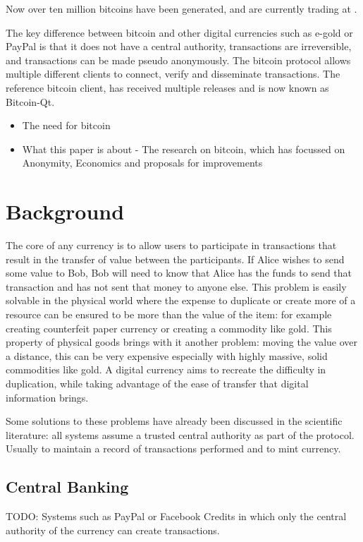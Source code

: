 Now over ten million bitcoins have been generated, and are currently trading at
.

The key difference between bitcoin and other digital currencies such as e-gold
or PayPal is that it does not have a central authority, transactions are
irreversible, and transactions can be made pseudo anonymously.  The bitcoin
protocol allows multiple different clients to connect, verify and disseminate
transactions.  The reference bitcoin client, has received multiple releases and
is now known as Bitcoin-Qt.

\begin{itemize} \item The need for bitcoin \item What this paper is about - The
research on bitcoin, which has focussed on Anonymity, Economics and proposals
for improvements \end{itemize}

\section{Background} The core of any currency is to allow users to participate
in transactions that result in the transfer of value between the participants.
If Alice wishes to send some value to Bob, Bob will need to know that Alice has
the funds to send that transaction and has not sent that money to anyone else.
This problem is easily solvable in the physical world where the expense to
duplicate or create more of a resource can be ensured to be more than the value
of the item: for example creating counterfeit paper currency or creating a
commodity like gold.  This property of physical goods brings with it another
problem: moving the value over a distance, this can be very expensive
especially with highly massive, solid commodities like gold.  A digital
currency aims to recreate the difficulty in duplication, while taking advantage
of the ease of transfer that digital information brings.

Some solutions to these problems have already been discussed in the scientific
literature: all systems assume a trusted central authority as part of the
protocol. Usually to maintain a record of transactions performed and to mint
currency.

\subsection{Central Banking} TODO: Systems such as PayPal or Facebook Credits
in which only the central authority of the currency can create transactions.

